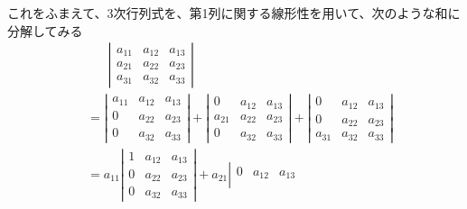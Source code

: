\documentclass[../../../topic_linear-algebra]{subfiles}
\begin{document}
これをふまえて、3次行列式を、第1列に関する線形性を用いて、次のような和に分解してみる
\begin{align*}
   & \phantom{=\,\,} \left| \begin{matrix}
                              a_{11} & a_{12} & a_{13} \\
                              a_{21} & a_{22} & a_{23} \\
                              a_{31} & a_{32} & a_{33}
                            \end{matrix} \right|                                                                \\
   & = \left| \begin{matrix}
                a_{11} & a_{12} & a_{13} \\
                0      & a_{22} & a_{23} \\
                0      & a_{32} & a_{33}
              \end{matrix} \right| + \left| \begin{matrix}
                                              0      & a_{12} & a_{13} \\
                                              a_{21} & a_{22} & a_{23} \\
                                              0      & a_{32} & a_{33}
                                            \end{matrix} \right| + \left| \begin{matrix}
                                                                            0      & a_{12} & a_{13} \\
                                                                            0      & a_{22} & a_{23} \\
                                                                            a_{31} & a_{32} & a_{33}
                                                                          \end{matrix} \right|                  \\
   & = a_{11} \left| \begin{matrix}
                       1 & a_{12} & a_{13} \\
                       0 & a_{22} & a_{23} \\
                       0 & a_{32} & a_{33}
                     \end{matrix} \right| + a_{21} \left| \begin{matrix}
                                                            0 & a_{12} & a_{13} \\

\end{matrix}
\end{align*}
\end{document}
